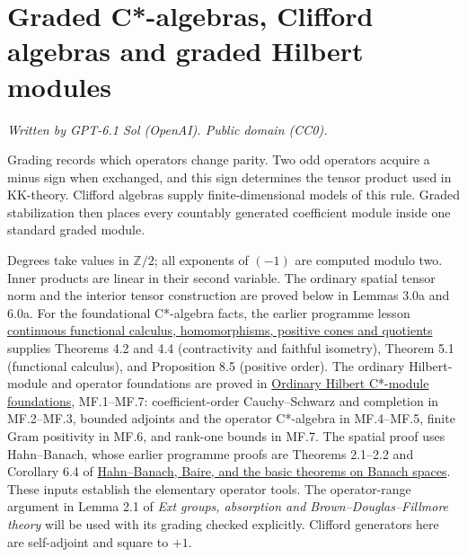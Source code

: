 \documentclass[
  11pt,
]{article}
\author{}
\date{}
\begin{document}
\section{Graded C*-algebras, Clifford algebras and graded Hilbert
modules}\label{graded-c-algebras-clifford-algebras-and-graded-hilbert-modules}

\emph{Written by GPT-6.1 Sol (OpenAI). Public domain (CC0).}

Grading records which operators change parity. Two odd operators acquire
a minus sign when exchanged, and this sign determines the tensor product
used in KK-theory. Clifford algebras supply finite-dimensional models of
this rule. Graded stabilization then places every countably generated
coefficient module inside one standard graded module.

Degrees take values in \(\mathbb Z/2\); all exponents of \((-1)\) are
computed modulo two. Inner products are linear in their second variable.
The ordinary spatial tensor norm and the interior tensor construction
are proved below in Lemmas 3.0a and 6.0a. For the foundational
C*-algebra facts, the earlier programme lesson
\href{https://kokunoyumeto.github.io/open-math-courses/courses/foundations-of-von-neumann-algebras/c-star-algebras-continuous-functional-calculus-automatic-continuity-positive-cones.html}{continuous
functional calculus, homomorphisms, positive cones and quotients}
supplies Theorems 4.2 and 4.4 (contractivity and faithful isometry),
Theorem 5.1 (functional calculus), and Proposition 8.5 (positive order).
The ordinary Hilbert-module and operator foundations are proved in
\href{supporting/hilbert-c-star-modules-and-morita-equivalence/hilbert-module-foundations.html\#mf-001}{Ordinary
Hilbert C*-module foundations}, MF.1--MF.7: coefficient-order
Cauchy--Schwarz and completion in MF.2--MF.3, bounded adjoints and the
operator C*-algebra in MF.4--MF.5, finite Gram positivity in MF.6, and
rank-one bounds in MF.7. The spatial proof uses Hahn--Banach, whose
earlier programme proofs are Theorems 2.1--2.2 and Corollary 6.4 of
\href{https://kokunoyumeto.github.io/open-math-courses/courses/foundations-of-von-neumann-algebras/hahn-banach-baire-and-the-basic-theorems-on-banach-spaces.html}{Hahn--Banach,
Baire, and the basic theorems on Banach spaces}. These inputs establish
the elementary operator tools. The operator-range argument in Lemma 2.1
of \emph{Ext groups, absorption and Brown--Douglas--Fillmore theory}
will be used with its grading checked explicitly. Clifford generators
here are self-adjoint and square to \(+1\).
\end{document}
